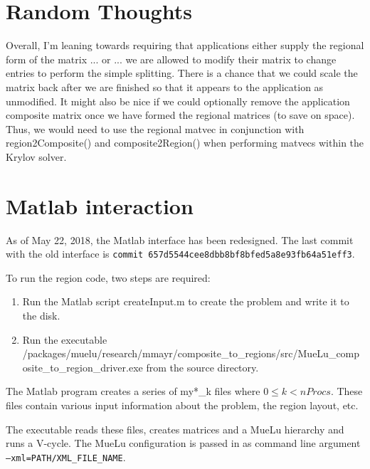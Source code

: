 \documentclass[11pt]{article}
\begin{document}
\section{Random Thoughts}
Overall, I'm leaning towards requiring that applications either supply
the regional form of the matrix ... or ... we are allowed to modify
their matrix to change entries to perform the simple splitting. There
is a chance that we could scale the matrix back after we are finished
so that it appears to the application as unmodified. It might also be
nice if we could optionally remove the application composite matrix once
we have formed the regional matrices (to save on space). Thus, we would
need to use the regional matvec in conjunction with {\sf region2Composite()}
and {\sf composite2Region()} when performing matvecs within the Krylov solver.

\appendix

\section{Matlab interaction}

As of May 22, 2018, the Matlab interface has been redesigned.
The last commit with the old interface is \texttt{commit 657d5544cee8dbb8bf8bfed5a8e93fb64a51eff3}.

To run the region code, two steps are required:
\begin{enumerate}
 \item Run the Matlab script {\sf createInput.m} to create the problem and write it to the disk.
 \item Run the executable {\sf /packages/muelu/research/mmayr/composite\_to\_regions/src/MueLu\_composite\_to\_region\_driver.exe} from the source directory.
\end{enumerate}

The Matlab program creates a series of {\sf my*\_k} files where $ 0 \le k < nProcs$.
These files contain various input information about the problem, the region layout, etc.

The executable reads these files, creates matrices and a MueLu hierarchy and runs a V-cycle. The MueLu configuration is passed in as command line argument \texttt{--xml=PATH/XML\_FILE\_NAME}.
\end{document}
